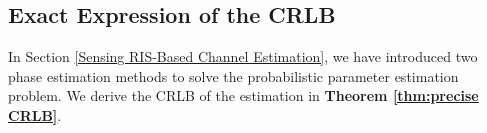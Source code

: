 \documentclass[conference,10pt,twocolumn]{IEEEtran}
\theoremstyle{nonumberplain}
\begin{document}
%
%
    
\subsection{Exact Expression of the CRLB} \label{Precise CRLB}
In Section \ref{Sensing RIS-Based Channel Estimation}, we have introduced two phase estimation methods to solve the probabilistic parameter estimation problem.
We derive the CRLB of the estimation in \textbf{Theorem \ref{thm:precise CRLB}}.
    
\end{document}
